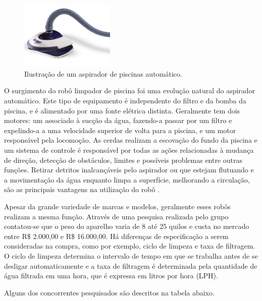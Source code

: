 \begin{figure}[h]
    \centering
    \includegraphics[width=0.4\textwidth]{figures/limpa_piscina_auto.png}
    \caption{Ilustração de um aspirador de piscinas automático. \cite{pentair2012}}
    \label{fig:schema-way-robot}
  \end{figure}

O surgimento do robô limpador de piscina foi uma evolução natural do aspirador
automático. Este tipo de equipamento é independente do filtro e da bomba da
piscina, e é alimentado por uma fonte elétrica distinta. Geralmente tem dois
motores: um associado à sucção da água, fazendo-a passar por um filtro e 
expelindo-a a uma velocidade superior de volta para a piscina, e um motor
responsável pela locomoção. As cerdas realizam a escovação do fundo da piscina
e um sistema de controle é responsável por todas as ações relacionadas à
mudança de direção, detecção de obstáculos, limites e possíveis problemas entre
outras funções. Retirar detritos inalcançáveis pelo aspirador ou que estejam flutuando
e a movimentação da água enquanto limpa a superfície, melhorando a circulação, são
as principais vantagens na utilização do robô \cite{silva2015}.
 
Apesar da grande variedade de marcas e modelos, geralmente esses robôs realizam
a mesma função. Através de uma pesquisa realizada pelo grupo contatou-se que o
peso do aparelho varia de 8 até 25 quilos e  custa no mercado entre  R\$ 2.000,00
e R\$ 16.000,00. Há diferenças de especificação a serem consideradas na compra,
como por exemplo, ciclo de limpeza e taxa de filtragem. O ciclo de limpeza determina
o intervalo de tempo em que se trabalha antes de se desligar automaticamente e a taxa
de filtragem é determinada pela quantidade de água filtrada em uma hora, que é expressa
em litros por hora (LPH).

Alguns dos concorrentes pesquisados são descritos na tabela abaixo.

